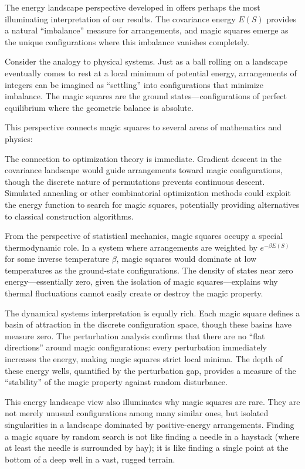 The energy landscape perspective developed in  offers perhaps 
the most illuminating interpretation of our results.
The covariance energy $E(S)$ provides a natural ``imbalance'' measure for arrangements,
and magic squares emerge as the unique configurations where this imbalance vanishes completely.

Consider the analogy to physical systems.
Just as a ball rolling on a landscape eventually comes to rest at a local minimum of potential energy,
arrangements of integers can be imagined as ``settling'' into configurations that minimize imbalance.
The magic squares are the ground states---configurations of perfect equilibrium 
where the geometric balance is absolute.

This perspective connects magic squares to several areas of mathematics and physics:

The connection to optimization theory is immediate.
Gradient descent in the covariance landscape would guide arrangements toward magic configurations,
though the discrete nature of permutations prevents continuous descent.
Simulated annealing or other combinatorial optimization methods could exploit the energy function
to search for magic squares, potentially providing alternatives to classical construction algorithms.

From the perspective of statistical mechanics, magic squares occupy a special thermodynamic role.
In a system where arrangements are weighted by $e^{-\beta E(S)}$ for some inverse temperature $\beta$,
magic squares would dominate at low temperatures as the ground-state configurations.
The density of states near zero energy---essentially zero, given the isolation of magic squares---explains 
why thermal fluctuations cannot easily create or destroy the magic property.

The dynamical systems interpretation is equally rich.
Each magic square defines a basin of attraction in the discrete configuration space,
though these basins have measure zero.
The perturbation analysis confirms that there are no ``flat directions'' around magic configurations:
every perturbation immediately increases the energy, making magic squares strict local minima.
The depth of these energy wells, quantified by the perturbation gap, provides a measure 
of the ``stability'' of the magic property against random disturbance.

This energy landscape view also illuminates why magic squares are rare.
They are not merely unusual configurations among many similar ones, but isolated singularities 
in a landscape dominated by positive-energy arrangements.
Finding a magic square by random search is not like finding a needle in a haystack 
(where at least the needle is surrounded by hay);
it is like finding a single point at the bottom of a deep well in a vast, rugged terrain.

